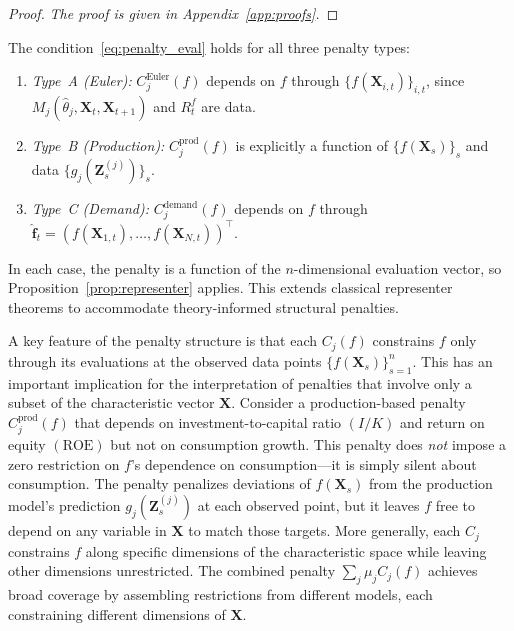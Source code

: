 \begin{proof}
\emph{The proof is given in Appendix~\ref{app:proofs}.}
\end{proof}

\begin{remark}
\label{rem:verify_representer}
The condition~\eqref{eq:penalty_eval} holds for all three penalty types:
\begin{enumerate}[label=(\alph*)]
\item \emph{Type~A (Euler):}
  $C_j^{\mathrm{Euler}}(f)$ depends on $f$ through
  $\{f(\mathbf{X}_{i,t})\}_{i,t}$, since
  $M_j(\hat{\theta}_j, \mathbf{X}_t, \mathbf{X}_{t+1})$ and $R_t^f$
  are data.
\item \emph{Type~B (Production):}
  $C_j^{\mathrm{prod}}(f)$ is explicitly a function of
  $\{f(\mathbf{X}_s)\}_{s}$ and data $\{g_j(\mathbf{Z}_s^{(j)})\}_s$.
\item \emph{Type~C (Demand):}
  $C_j^{\mathrm{demand}}(f)$ depends on $f$ through
  $\hat{\mathbf{f}}_t = (f(\mathbf{X}_{1,t}), \ldots, f(\mathbf{X}_{N,t}))^\top$.
\end{enumerate}
In each case, the penalty is a function of the $n$-dimensional evaluation
vector, so Proposition~\ref{prop:representer} applies.
This extends classical representer theorems to accommodate theory-informed
structural penalties.
\end{remark}

\begin{remark}
\label{rem:evaluation_dependence}
A key feature of the penalty structure is that each $C_j(f)$ constrains
$f$ only through its evaluations at the observed data points
$\{f(\mathbf{X}_s)\}_{s=1}^n$.
This has an important implication for the interpretation of penalties
that involve only a subset of the characteristic vector $\mathbf{X}$.
Consider a production-based penalty $C_j^{\mathrm{prod}}(f)$ that depends
on investment-to-capital ratio $(I/K)$ and return on equity $(\mathrm{ROE})$
but not on consumption growth.
This penalty does \emph{not} impose a zero restriction on $f$'s dependence
on consumption---it is simply silent about consumption.
The penalty penalizes deviations of $f(\mathbf{X}_s)$ from the production
model's prediction $g_j(\mathbf{Z}_s^{(j)})$ at each observed point,
but it leaves $f$ free to depend on any variable in $\mathbf{X}$
to match those targets.
More generally, each $C_j$ constrains $f$ along specific dimensions
of the characteristic space while leaving other dimensions unrestricted.
The combined penalty $\sum_j \mu_j C_j(f)$ achieves broad coverage
by assembling restrictions from different models, each constraining
different dimensions of $\mathbf{X}$.
\end{remark}

